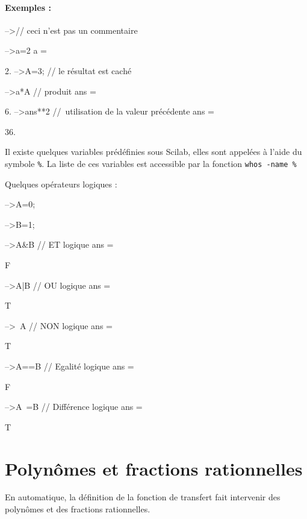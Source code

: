 \paragraph{Exemples :}
\begin{Scilabcode}
-->// ceci n'est pas un commentaire

-->a=2
 a  =
      
    2. 
-->A=3;   // le résultat est caché

-->a*A    // produit
 ans  =

    6.  
-->ans**2 // utilisation de la valeur précédente
 ans  =
  
    36.  
\end{Scilabcode}
Il existe quelques variables prédéfinies sous Scilab, elles sont appelées à 
l'aide du symbole \og\verb?%?\fg. La liste de ces variables est accessible 
par la fonction \verb?whos -name %?
\begin{Scilabcode}
\end{Scilabcode}
Quelques opérateurs logiques : 
\begin{Scilabcode}
-->A=0;

-->B=1;

-->A&B    // ET logique
 ans  =
 
  F 

-->A|B    // OU logique
 ans  =
 
  T 

-->~A     // NON logique
 ans  =
 
  T 

-->A==B   // Egalité logique
 ans  =
 
  F

-->A~=B   // Différence logique
 ans  =
 
  T
\end{Scilabcode}
\section{Polynômes et fractions rationnelles}
En automatique, la définition de la fonction de transfert 
fait intervenir des polynômes et des fractions rationnelles.

